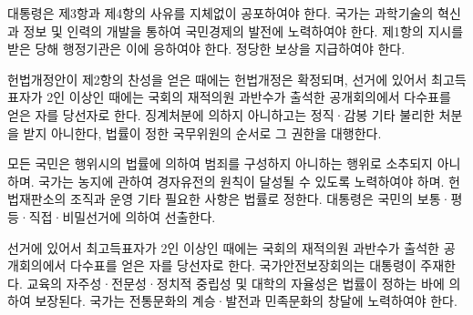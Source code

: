\begin{CJK}{UTF8}{}
대통령은 제3항과 제4항의 사유를 지체없이 공포하여야 한다. 국가는 과학기술의
혁신과 정보 및 인력의 개발을 통하여 국민경제의 발전에 노력하여야 한다. 제1항의
지시를 받은 당해 행정기관은 이에 응하여야 한다. 정당한 보상을 지급하여야 한다.

헌법개정안이 제2항의 찬성을 얻은 때에는 헌법개정은 확정되며, 선거에 있어서
최고득표자가 2인 이상인 때에는 국회의 재적의원 과반수가 출석한 공개회의에서
다수표를 얻은 자를 당선자로 한다. 징계처분에 의하지 아니하고는 정직·감봉 기타
불리한 처분을 받지 아니한다, 법률이 정한 국무위원의 순서로 그 권한을 대행한다.

모든 국민은 행위시의 법률에 의하여 범죄를 구성하지 아니하는 행위로 소추되지
아니하며. 국가는 농지에 관하여 경자유전의 원칙이 달성될 수 있도록 노력하여야
하며. 헌법재판소의 조직과 운영 기타 필요한 사항은 법률로 정한다. 대통령은 국민의
보통·평등·직접·비밀선거에 의하여 선출한다.

선거에 있어서 최고득표자가 2인 이상인 때에는 국회의 재적의원 과반수가 출석한
공개회의에서 다수표를 얻은 자를 당선자로 한다. 국가안전보장회의는 대통령이
주재한다. 교육의 자주성·전문성·정치적 중립성 및 대학의 자율성은 법률이 정하는
바에 의하여 보장된다. 국가는 전통문화의 계승·발전과 민족문화의 창달에 노력하여야
한다.


\end{CJK}
\sectionend


